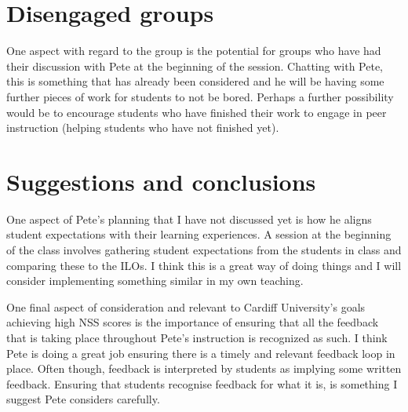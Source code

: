 \documentclass{article}
\begin{document}
\section{Disengaged groups}

One aspect with regard to the group is the potential for groups who have had their discussion with Pete at the beginning of the session. Chatting with Pete, this is something that has already been considered and he will be having some further pieces of work for students to not be bored. Perhaps a further possibility would be to encourage students who have finished their work to engage in peer instruction (helping students who have not finished yet).

\section{Suggestions and conclusions}

One aspect of Pete's planning that I have not discussed yet is how he aligns student expectations with their learning experiences. A session at the beginning of the class involves gathering student expectations from the students in class and comparing these to the ILOs. I think this is a great way of doing things and I will consider implementing something similar in my own teaching.

One final aspect of consideration and relevant to Cardiff University's goals achieving high NSS scores is the importance of ensuring that all the feedback that is taking place throughout Pete's instruction is recognized as such. I think Pete is doing a great job ensuring there is a timely and relevant feedback loop in place. Often though, feedback is interpreted by students as implying some written feedback. Ensuring that students recognise feedback for what it is, is something I suggest Pete considers carefully.
\end{document}
